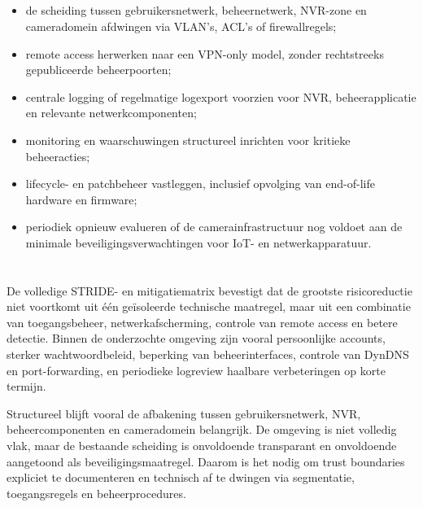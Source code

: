 \subsection{}%
\label{app:structurele-verbeteringen}

\begin{itemize}
    \item de scheiding tussen gebruikersnetwerk, beheernetwerk, NVR-zone en cameradomein afdwingen via VLAN's, ACL's of firewallregels;
    \item remote access herwerken naar een VPN-only model, zonder rechtstreeks gepubliceerde beheerpoorten;
    \item centrale logging of regelmatige logexport voorzien voor NVR, beheerapplicatie en relevante netwerkcomponenten;
    \item monitoring en waarschuwingen structureel inrichten voor kritieke beheeracties;
    \item lifecycle- en patchbeheer vastleggen, inclusief opvolging van end-of-life hardware en firmware;
    \item periodiek opnieuw evalueren of de camerainfrastructuur nog voldoet aan de minimale beveiligingsverwachtingen voor IoT- en netwerkapparatuur.
\end{itemize}

\section{}%
\label{app:stride-samenvatting}

De volledige STRIDE- en mitigatiematrix bevestigt dat de grootste risicoreductie niet voortkomt uit één geïsoleerde technische maatregel, maar uit een combinatie van toegangsbeheer, netwerkafscherming, controle van remote access en betere detectie. Binnen de onderzochte omgeving zijn vooral persoonlijke accounts, sterker wachtwoordbeleid, beperking van beheerinterfaces, controle van DynDNS en port-forwarding, en periodieke logreview haalbare verbeteringen op korte termijn.

Structureel blijft vooral de afbakening tussen gebruikersnetwerk, NVR, beheercomponenten en cameradomein belangrijk. De omgeving is niet volledig vlak, maar de bestaande scheiding is onvoldoende transparant en onvoldoende aangetoond als beveiligingsmaatregel. Daarom is het nodig om trust boundaries expliciet te documenteren en technisch af te dwingen via segmentatie, toegangsregels en beheerprocedures.
